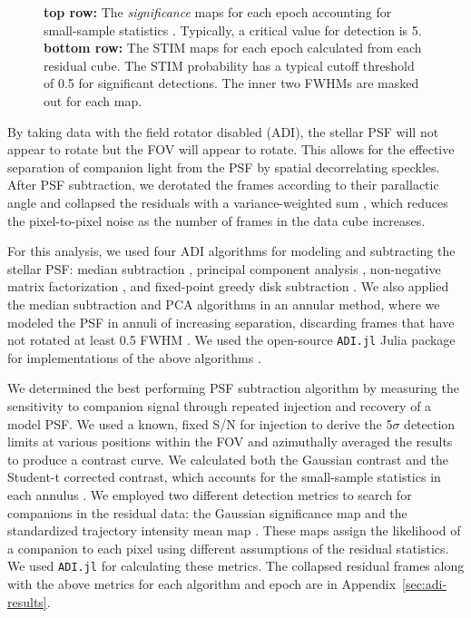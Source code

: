 \documentclass[twocolumn,linenumbers]{aastex631}
\begin{document}
\begin{figure*}
    \centering
    \caption{\textbf{top row:} The \textit{significance} maps for each epoch accounting for small-sample statistics \citep{mawetFundamentalLimitationsHigh2014}. Typically, a critical value for detection is 5. \textbf{bottom row:} The STIM maps for each epoch calculated from each residual cube. The STIM probability has a typical cutoff threshold of 0.5 for significant detections. The inner two FWHMs are masked out for each map.}
    \label{fig:detection}
\end{figure*}

By taking data with the field rotator disabled (ADI), the stellar PSF will not appear to rotate but the FOV will appear to rotate. This allows for the effective separation of companion light from the PSF by spatial decorrelating speckles.  After PSF subtraction, we derotated the frames according to their parallactic angle and collapsed the residuals with a variance-weighted sum \citep{bottomNoiseweightedAngularDifferential2017a}, which reduces the pixel-to-pixel noise as the number of frames in the data cube increases.

For this analysis, we used four ADI algorithms for modeling and subtracting the stellar PSF: median subtraction \citep{maroisAngularDifferentialImaging2006}, principal component analysis \citep[PCA, also referred to as KLIP;][]{soummerDetectionCharacterizationExoplanets2012a}, non-negative matrix factorization \citep[NMF;][]{renNonnegativeMatrixFactorization2018a}, and fixed-point greedy disk subtraction \citep[GreeDS;][]{pairetReferencelessAlgorithmCircumstellar2019a,pairetMAYONNAISEMorphologicalComponents2020}. We also applied the median subtraction and PCA algorithms in an annular method, where we modeled the PSF in annuli of increasing separation, discarding frames that have not rotated at least 0.5 FWHM \citep{maroisAngularDifferentialImaging2006}. We used the open-source \texttt{ADI.jl} Julia package for implementations of the above algorithms \citep{lucasADIJlJulia2020}.

We determined the best performing PSF subtraction algorithm by measuring the sensitivity to companion signal through repeated injection and recovery of a model PSF. We used a known, fixed S/N for injection to derive the 5$\sigma$ detection limits at various positions within the FOV and azimuthally averaged the results to produce a contrast curve. We calculated both the Gaussian contrast and the Student-t corrected contrast, which accounts for the small-sample statistics in each annulus \citep{mawetFundamentalLimitationsHigh2014}. We employed two different detection metrics to search for companions in the residual data: the Gaussian significance map \citep{mawetFundamentalLimitationsHigh2014} and the standardized trajectory intensity mean map \citep[STIM map;][]{pairetSTIMMapDetection2019}. These maps assign the likelihood of a companion to each pixel using different assumptions of the residual statistics. We used \texttt{ADI.jl} for calculating these metrics. The collapsed residual frames along with the above metrics for each algorithm and epoch are in Appendix~\ref{sec:adi-results}.
\end{document}
